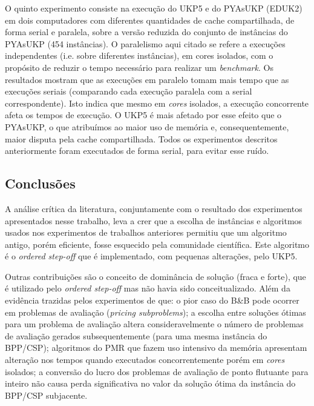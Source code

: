 O quinto experimento consiste na execução do UKP5 e do PYAsUKP (EDUK2) em dois computadores com diferentes quantidades de cache compartilhada, de forma serial e paralela, sobre a versão reduzida do conjunto de instâncias do PYAsUKP (454 instâncias).
O paralelismo aqui citado se refere a execuções independentes (i.e. sobre diferentes instâncias), em cores isolados, com o propósito de reduzir o tempo necessário para realizar um \emph{benchmark}.
Os resultados mostram que as execuções em paralelo tomam mais tempo que as execuções seriais (comparando cada execução paralela com a serial correspondente).
Isto indica que mesmo em \emph{cores} isolados, a execução concorrente afeta os tempos de execução.
O UKP5 é mais afetado por esse efeito que o PYAsUKP, o que atribuímos ao maior uso de memória e, consequentemente, maior disputa pela cache compartilhada.
Todos os experimentos descritos anteriormente foram executados de forma serial, para evitar esse ruído.

\subsection{Conclusões}

A análise crítica da literatura, conjuntamente com o resultado dos experimentos apresentados nesse trabalho, leva a crer que a escolha de instâncias e algoritmos usados nos experimentos de trabalhos anteriores permitiu que um algoritmo antigo, porém eficiente, fosse esquecido pela comunidade científica.  
Este algoritmo é o \emph{ordered step-off} que é implementado, com pequenas alterações, pelo UKP5.

Outras contribuições são o conceito de dominância de solução (fraca e forte), que é utilizado pelo \emph{ordered step-off} mas não havia sido conceitualizado.
Além da evidência trazidas pelos experimentos de que: o pior caso do B\&B pode ocorrer em problemas de avaliação (\emph{pricing subproblems}); a escolha entre soluções ótimas para um problema de avaliação altera consideravelmente o número de problemas de avaliação gerados subsequentemente (para uma mesma instância do BPP/CSP); algoritmos do PMR que fazem uso intensivo da memória apresentam alteração nos tempos quando executados concorrentemente porém em \emph{cores} isolados; a conversão do lucro dos problemas de avaliação de ponto flutuante para inteiro não causa perda significativa no valor da solução ótima da instância do BPP/CSP subjacente. 

